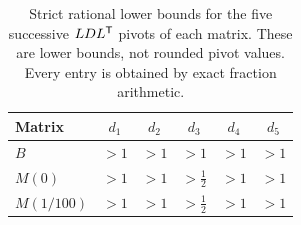 \begin{table}[ht]
\centering\small
\begin{tabular}{@{}lccccc@{}}
\toprule
Matrix & $d_1$ & $d_2$ & $d_3$ & $d_4$ & $d_5$\\
\midrule
$B$ & $>1$ & $>1$ & $>1$ & $>1$ & $>1$\\[3pt]
$M(0)$ & $>1$ & $>1$ & $>\frac{1}{2}$ & $>1$ & $>1$\\[3pt]
$M(1/100)$ & $>1$ & $>1$ & $>\frac{1}{2}$ & $>1$ & $>1$\\[3pt]
\bottomrule
\end{tabular}
\caption{Strict rational lower bounds for the five successive $LDL^\mathsf T$ pivots of each matrix. These are lower bounds, not rounded pivot values. Every entry is obtained by exact fraction arithmetic.}
\label{tab:pivots}
\end{table}
